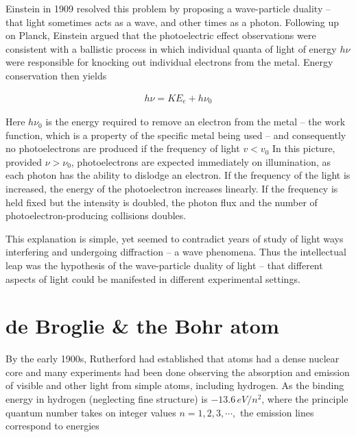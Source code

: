 Einstein in 1909 resolved this problem by proposing a wave-particle duality --
that light sometimes acts as a wave, and other times as a photon. Following up
on Planck, Einstein argued that the photoelectric effect observations were
consistent with a ballistic process in which individual quanta of light of
energy $h\nu$ were responsible for knocking out individual electrons from the
metal. Energy conservation then yields 

\begin{align} \label{eq:energy}
h\nu = KE_e + h\nu_0
\end{align} \vspace{3px}

Here $h\nu_0$ is the energy required to remove an electron from the metal --
the work function, which is a property of the specific metal being used -- and
consequently no photoelectrons are produced if the frequency of light $v < v_0$
In this picture, provided $\nu > \nu_0$, photoelectrons are expected
immediately on illumination, as each photon has the ability to dislodge an
electron. If the frequency of the light is increased, the energy of the
photoelectron increases linearly. If the frequency is held fixed but the
intensity is doubled, the photon flux and the number of photoelectron-producing
collisions doubles. 

This explanation is simple, yet seemed to contradict years of study of light
ways interfering and undergoing diffraction -- a wave phenomena. Thus the
intellectual leap was the hypothesis of the wave-particle duality of light --
that different aspects of light could be manifested in different experimental
settings. 

\section{de Broglie \& the Bohr atom} 

By the early 1900s, Rutherford had established that atoms had a dense nuclear
core and many experiments had been done observing the absorption and emission
of visible and other light from simple atoms, including hydrogen. As the
binding energy in hydrogen (neglecting fine structure) is $-13.6\, eV/n^2$, where
the principle quantum number takes on integer values $n = 1, 2, 3, \cdots,$ the
emission lines correspond to energies 

